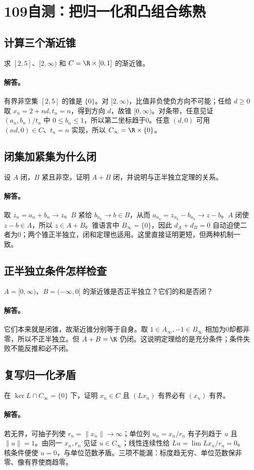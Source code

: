 \clearpage\section{109自测：把归一化和凸组合练熟}
\subsection{计算三个渐近锥}
求 $[2,5]$、$[2,\infty)$ 和 $C=\R\times[0,1]$ 的渐近锥。
\paragraph{解答。}有界非空集 $[2,5]$ 的锥是 $\{0\}$。对 $[2,\infty)$，比值非负使负方向不可能；任给 $d\ge0$ 取 $x_n=2+nd,t_n=n$，得到方向 $d$，故锥 $[0,\infty)$。对条带，任意见证 $(a_n,b_n)/t_n$ 中 $0\le b_n\le1$，所以第二坐标趋于0。任意 $(d,0)$ 可用 $(nd,0)\in C$、$t_n=n$ 实现，所以 $C_\infty=\R\times\{0\}$。
\subsection{闭集加紧集为什么闭}
设 $A$ 闭，$B$ 紧且非空，证明 $A+B$ 闭，并说明与正半独立定理的关系。
\paragraph{解答。}取 $z_n=a_n+b_n\to z$。$B$ 紧给 $b_{n_k}\to b\in B$，从而 $a_{n_k}=z_{n_k}-b_{n_k}\to z-b$。$A$ 闭使 $z-b\in A$，所以 $z\in A+B$。锥语言中 $B_\infty=\{0\}$，因此 $d_A+d_B=0$ 自动迫使二者为0；两个锥正半独立，闭和定理也适用。这里直接证明更短，但两种机制一致。
\subsection{正半独立条件怎样检查}
$A=[0,\infty)$、$B=(-\infty,0]$ 的渐近锥是否正半独立？它们的和是否闭？
\paragraph{解答。}它们本来就是闭锥，故渐近锥分别等于自身。取 $1\in A_\infty,-1\in B_\infty$ 相加为0却都非零，所以不正半独立。但 $A+B=\R$ 仍闭。这说明定理给的是充分条件；条件失败不能反推和必不闭。
\subsection{复写归一化矛盾}
在 $\ker L\cap C_\infty=\{0\}$ 下，证明 $x_n\in C$ 且 $(Lx_n)$ 有界必有 $(x_n)$ 有界。
\paragraph{解答。}若无界，可抽子列使 $r_n=\|x_n\|\to\infty$；单位列 $u_n=x_n/r_n$ 有子列趋于 $u$ 且 $\|u\|=1$。由同一 $x_n,r_n$ 见证 $u\in C_\infty$；线性连续性给 $Lu=\lim Lx_n/r_n=0$。核条件便使 $u=0$，与单位范数矛盾。三项不能漏：标度趋无穷、单位范数保非零、像有界使商趋零。
